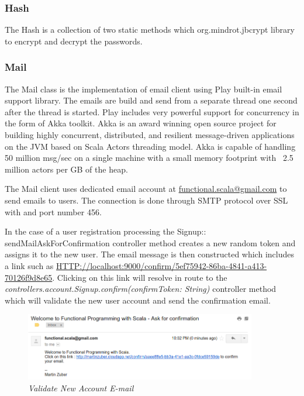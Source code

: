 \documentclass[12pt,twoside,a4paper]{report}
\begin{document}
\subsubsection{Hash}
The Hash is a collection of two static methods which org.mindrot.jbcrypt library to encrypt and decrypt the passwords.

\subsubsection{Mail}
The Mail class is the implementation of email client using Play built-in email support library. The emails are build and send from a separate thread one second after the thread is started. Play includes very powerful support for concurrency in the form of Akka toolkit.\cite{33} Akka is an award winning open source project for building highly concurrent,
distributed, and resilient message-driven applications on the JVM based on Scala Actors threading model. Akka is capable of handling 50 million msg/sec on a single machine with a small memory footprint with ~2.5 million actors per GB of the heap.

The Mail client uses dedicated email account at \url{functional.scala@gmail.com} to send emails to users. The connection is done through SMTP protocol over SSL with and port number 456.

In the case of a user registration processing the Signup:: sendMailAskForConfirmation controller method creates a new random token and assigns it to the new user. The email message is then constructed which includes a link such as \url{ HTTP://localhost:9000/confirm/5ef75942-86ba-4841-a413-70126f9d8e65}. Clicking on this link will resolve in route to the \emph{controllers.account.Signup.confirm(confirmToken: String)} controller method which will validate the new user account and send the confirmation email.

\begin{figure}[!ht]
	\centering
		\includegraphics[width=0.9\textwidth, totalheight=4cm]
		{register_confirmation_email}
	\caption{\textit{Validate New Account E-mail}}
	\label{f4.4.1.1}
\end{figure}
\end{document}
